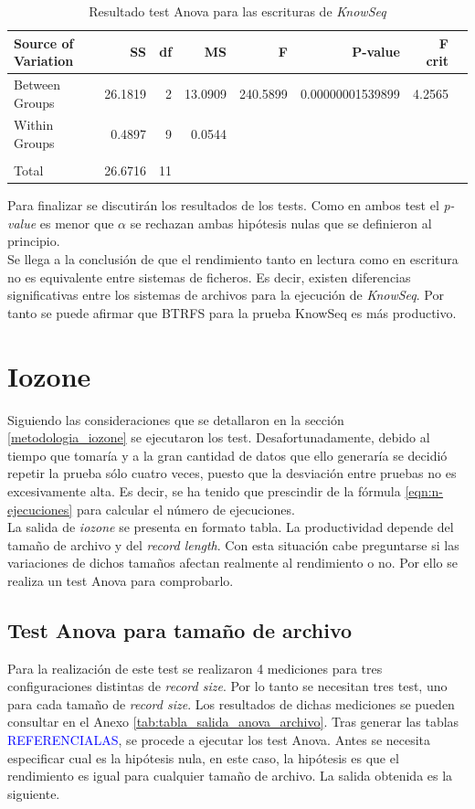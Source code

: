 \begin{table}[!htp]\centering
\scriptsize
\begin{tabular}{lrrrrrrr}\toprule
Source of Variation &SS &df &MS &F &P-value &F crit \\\midrule
Between Groups &26.1819 &2 &13.0909 &240.5899 &0.00000001539899 &4.2565 \\
Within Groups &0.4897 &9 &0.0544 & & & \\
& & & & & & \\
Total &26.6716 &11 & & & & \\
\bottomrule
\end{tabular}
\caption{Resultado test Anova para las escrituras de \textit{KnowSeq}}\label{tab: }
\end{table}

Para finalizar se discutirán los resultados de los tests. Como en ambos test el \textit{p-value} es menor que $\alpha$ se rechazan ambas hipótesis nulas que se definieron al principio.\\

Se llega a la conclusión de que el rendimiento tanto en lectura como en escritura no es equivalente entre sistemas de ficheros. Es decir, existen diferencias significativas entre los sistemas de archivos para la ejecución de \textit{KnowSeq}. Por tanto se puede afirmar que BTRFS para la prueba KnowSeq es más productivo.

\section{Iozone}
Siguiendo las consideraciones que se detallaron en la sección \ref{metodologia_iozone} se ejecutaron los test. Desafortunadamente, debido al tiempo que tomaría y a la gran cantidad de datos que ello generaría se decidió repetir la prueba sólo cuatro veces, puesto que la desviación entre pruebas no es excesivamente alta. Es decir, se ha tenido que prescindir de la fórmula \ref{eqn:n-ejecuciones} para calcular el número de ejecuciones.\\

La salida de \textit{iozone} se presenta en formato tabla. La productividad depende del tamaño de archivo y del \textit{record length}. Con esta situación cabe preguntarse si las variaciones de dichos tamaños afectan realmente al rendimiento o no. Por ello se realiza un test Anova para comprobarlo.

\subsection{Test Anova para tamaño de archivo}
Para la realización de este test se realizaron 4 mediciones para tres configuraciones distintas de \textit{record size}. Por lo tanto se necesitan tres test, uno para cada tamaño de \textit{record size}.  Los resultados de dichas mediciones se pueden consultar en el Anexo \ref{tab:tabla_salida_anova_archivo}. Tras generar las tablas \textcolor{blue}{REFERENCIALAS}, se procede a ejecutar los test Anova. Antes se necesita especificar cual es la hipótesis nula, en este caso, la hipótesis es que el rendimiento es igual para cualquier tamaño de archivo. La salida obtenida es la siguiente. 

